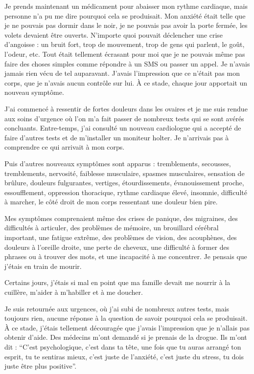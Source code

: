 Je prends maintenant un médicament pour abaisser mon rythme cardiaque, mais
personne n'a pu me dire pourquoi cela se produisait. Mon anxiété était telle que
je ne pouvais pas dormir dans le noir, je ne pouvais pas avoir la porte fermée,
les volets devaient être ouverts. N'importe quoi pouvait déclencher une crise
d'angoisse : un bruit fort, trop de mouvement, trop de gens qui parlent, le
goût, l'odeur, etc. Tout était tellement écrasant pour moi que je ne pouvais
même pas faire des choses simples comme répondre à un SMS ou passer un appel. Je
n'avais jamais rien vécu de tel auparavant. J'avais l'impression que ce n'était
pas mon corps, que je n'avais aucun contrôle sur lui. À ce stade, chaque jour
apportait un nouveau symptôme.

J'ai commencé à ressentir de fortes douleurs dans les ovaires et je me suis
rendue aux soins d'urgence où l'on m'a fait passer de nombreux tests qui se sont
avérés concluants. Entre-temps, j'ai consulté un nouveau cardiologue qui a
accepté de faire d'autres tests et de m'installer un moniteur holter. Je
n'arrivais pas à comprendre ce qui arrivait à mon corps.

Puis d'autres nouveaux symptômes sont apparus : tremblements, secousses,
tremblements, nervosité, faiblesse musculaire, spasmes musculaires, sensation de
brûlure, douleurs fulgurantes, vertiges, étourdissements, évanouissement proche,
essoufflement, oppression thoracique, rythme cardiaque élevé, insomnie,
difficulté à marcher, le côté droit de mon corps ressentant une douleur bien
pire.

Mes symptômes comprenaient même des crises de panique, des migraines, des
difficultés à articuler, des problèmes de mémoire, un brouillard cérébral
important, une fatigue extrême, des problèmes de vision, des acouphènes, des
douleurs à l'oreille droite, une perte de cheveux, une difficulté à former des
phrases ou à trouver des mots, et une incapacité à me concentrer. Je pensais que
j'étais en train de mourir.

Certains jours, j'étais si mal en point que ma famille devait me nourrir à la
cuillère, m'aider à m'habiller et à me doucher.

Je suis retournée aux urgences, où j'ai subi de nombreux autres tests, mais
toujours rien, aucune réponse à la question de savoir pourquoi cela se
produisait. À ce stade, j'étais tellement découragée que j'avais l'impression
que je n'allais pas obtenir d'aide. Des médecins m'ont demandé si je prenais de
la drogue. Ils m'ont dit : “C'est psychologique, c'est dans ta tête, une fois
que tu auras arrangé ton esprit, tu te sentiras mieux, c'est juste de l'anxiété,
c'est juste du stress, tu dois juste être plus positive”.


